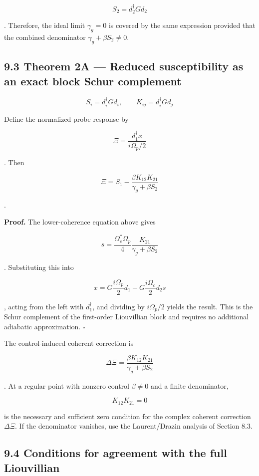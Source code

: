 \documentclass[
  10pt,
  a4paper,
]{article}
\begin{document}
\[
S_2=d_2^\dagger Gd_2
\]

. Therefore, the ideal limit \(\gamma_g=0\) is covered by the same
expression provided that the combined denominator
\(\gamma_g+\beta S_2\neq0\).

\subsection{9.3 Theorem 2A --- Reduced susceptibility as an exact block
Schur
complement}\label{theorem-2a-reduced-susceptibility-as-an-exact-block-schur-complement}

\[
S_i=d_i^\dagger Gd_i,
\qquad
K_{ij}=d_i^\dagger Gd_j
\]

Define the normalized probe response by

\[
\Xi
=\frac{d_1^\dagger x}{i\Omega_p/2}
\]

. Then

\[
\boxed{
\Xi
=S_1-
\frac{\beta K_{12}K_{21}}
{\gamma_g+\beta S_2}
}
\]

.

\textbf{Proof.} The lower-coherence equation above gives

\[
s=
\frac{\Omega_c^*\Omega_p}{4}
\frac{K_{21}}
{\gamma_g+\beta S_2}
\]

. Substituting this into

\[
x
=G\frac{i\Omega_p}{2}d_1
-G\frac{i\Omega_c}{2}d_2s
\]

, acting from the left with \(d_1^\dagger\), and dividing by
\(i\Omega_p/2\) yields the result. This is the Schur complement of the
first-order Liouvillian block and requires no additional adiabatic
approximation. \(\square\)

The control-induced coherent correction is

\[
\boxed{
\Delta\Xi
=\frac{\beta K_{12}K_{21}}
{\gamma_g+\beta S_2}
}
\]

. At a regular point with nonzero control \(\beta\neq0\) and a finite
denominator,

\[
\boxed{K_{12}K_{21}=0}
\]

is the necessary and sufficient zero condition for the complex coherent
correction \(\Delta\Xi\). If the denominator vanishes, use the
Laurent/Drazin analysis of Section 8.3.

\subsection{9.4 Conditions for agreement with the full
Liouvillian}\label{conditions-for-agreement-with-the-full-liouvillian}
\end{document}
